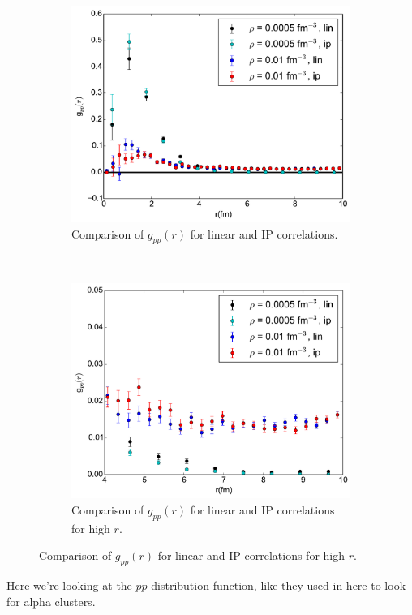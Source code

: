 \documentclass[12pt]{article}
\begin{document}
\begin{figure}[h!]
\begin{subfigure}{0.49\textwidth}
      \includegraphics[width=\textwidth]{../gpp_linVSip.pdf}
      \caption{Comparison of $g_{pp}(r)$ for linear and IP correlations.}
   \end{subfigure}
   ~
   \begin{subfigure}{0.49\textwidth}
      \includegraphics[width=\textwidth]{../gpp_linVSip_small.pdf}
      \caption{Comparison of $g_{pp}(r)$ for linear and IP correlations for high $r$.}
   \end{subfigure}
\end{figure}
Here we're looking at the $pp$ distribution function, like they used in \href{https://journals.aps.org/prl/pdf/10.1103/PhysRevLett.119.222505}{here} to look for alpha clusters.
\newpage
\end{document}
